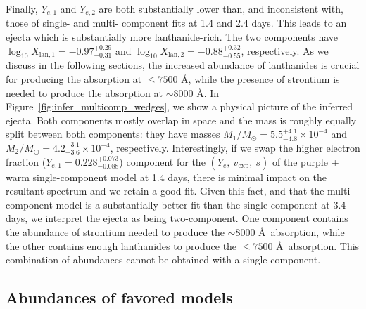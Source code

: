 \documentclass[twocolumn, twocolappendix]{aastex63}
\begin{document}
Finally, $Y_{e,1}$ and $Y_{e,2}$ are both substantially lower than, and inconsistent with, those of single- and multi- component fits at 1.4 and 2.4 days. This leads to an ejecta which is substantially more lanthanide-rich. The two components have $\log_{10} X_{\mathrm{lan},1} = -0.97^{+0.29}_{-0.31}$ and $\log_{10} X_{\mathrm{lan},2} = -0.88^{+0.32}_{-0.55}$, respectively. As we discuss in the following sections, the increased abundance of lanthanides is crucial for producing the absorption at $\leqslant 7500$ \AA, while the presence of strontium is needed to produce the absorption at $\sim 8000$ \AA. In Figure~\ref{fig:infer_multicomp_wedges}, we show a physical picture of the inferred ejecta. Both components mostly overlap in space and the mass is roughly equally split between both components: they have  masses $M_1/M_{\odot} = 5.5^{+4.1}_{-4.8} \times 10^{-4}$ and $M_2/M_{\odot} = 4.2^{+3.1}_{-3.6} \times 10^{-4}$, respectively. Interestingly, if we swap the higher electron fraction ($Y_{e,1} = 0.228^{+0.073}_{-0.088}$) component for the $(Y_e,~v_{\mathrm{exp}},~s)$ of the purple + warm single-component model at 1.4 days, there is minimal impact on the resultant spectrum and we retain a good fit. Given this fact, and that the multi-component model is a substantially better fit than the single-component at 3.4 days, we interpret the ejecta as being two-component. One component contains the abundance of strontium needed to produce the $\sim 8000$ \AA~absorption, while the other contains enough lanthanides to produce the $\leqslant 7500$ \AA~absorption. This combination of abundances cannot be obtained with a single-component. 


\subsection{Abundances of favored models}\label{ssc:results-abundances}
\end{document}
